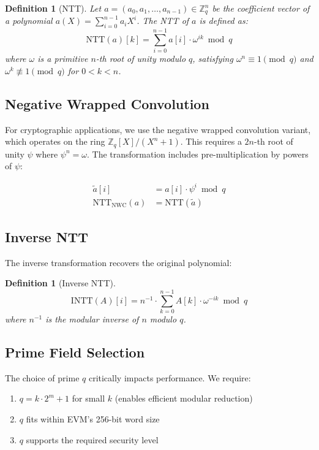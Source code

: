 \documentclass[11pt,a4paper]{article}
\newtheorem{definition}[theorem]{Definition}
\begin{document}
\begin{definition}[NTT]
Let $a = (a_0, a_1, \ldots, a_{n-1}) \in \mathbb{Z}_q^n$ be the coefficient vector of a polynomial $a(X) = \sum_{i=0}^{n-1} a_i X^i$. The NTT of $a$ is defined as:
\[
\text{NTT}(a)[k] = \sum_{i=0}^{n-1} a[i] \cdot \omega^{ik} \bmod q
\]
where $\omega$ is a primitive $n$-th root of unity modulo $q$, satisfying $\omega^n \equiv 1 \pmod{q}$ and $\omega^k \not\equiv 1 \pmod{q}$ for $0 < k < n$.
\end{definition}

\subsection{Negative Wrapped Convolution}

For cryptographic applications, we use the negative wrapped convolution variant, which operates on the ring $\mathbb{Z}_q[X]/(X^n + 1)$. This requires a $2n$-th root of unity $\psi$ where $\psi^n = \omega$. The transformation includes pre-multiplication by powers of $\psi$:

\begin{align}
\tilde{a}[i] &= a[i] \cdot \psi^i \bmod q \\
\text{NTT}_{\text{NWC}}(a) &= \text{NTT}(\tilde{a})
\end{align}

\subsection{Inverse NTT}

The inverse transformation recovers the original polynomial:

\begin{definition}[Inverse NTT]
\[
\text{INTT}(A)[i] = n^{-1} \cdot \sum_{k=0}^{n-1} A[k] \cdot \omega^{-ik} \bmod q
\]
where $n^{-1}$ is the modular inverse of $n$ modulo $q$.
\end{definition}

\subsection{Prime Field Selection}

The choice of prime $q$ critically impacts performance. We require:
\begin{enumerate}
\item $q = k \cdot 2^m + 1$ for small $k$ (enables efficient modular reduction)
\item $q$ fits within EVM's 256-bit word size
\item $q$ supports the required security level
\end{enumerate}
\end{document}
